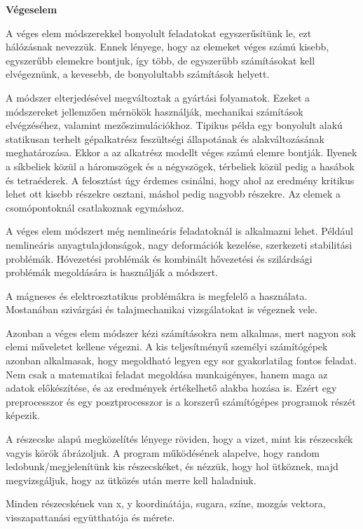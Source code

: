 \textbf{Végeselem}

A véges elem módszerekkel
bonyolult feladatokat egyszerűsítünk le, ezt hálózásnak nevezzük. Ennek lényege, hogy az elemeket véges számú kisebb, egyszerűbb elemekre bontjuk, így több, de egyszerűbb számításokat kell elvégeznünk, a kevesebb, de bonyolultabb számítások helyett.


A módszer elterjedésével megváltoztak a gyártási folyamatok. Ezeket a módszereket jellemzően mérnökök használják, mechanikai számítások elvégzéséhez, valamint mezőszimulációkhoz. Tipikus példa egy bonyolult alakú statikusan terhelt gépalkatrész feszültségi állapotának és alakváltozásának meghatározása. Ekkor a az alkatrész modellt véges számú elemre bontják. Ilyenek a síkbeliek közül a háromszögek és a négyszögek, térbeliek közül pedig a hasábok és tetraéderek. A felosztást úgy érdemes csinálni, hogy ahol az eredmény kritikus lehet ott kisebb részekre osztani, máshol pedig nagyobb részekre. Az elemek a csomópontoknál csatlakoznak egymáshoz. 


A véges elem módszert még nemlineáris feladatoknál is alkalmazni lehet. Például nemlineáris anyagtulajdonságok, nagy deformációk kezelése, szerkezeti stabilitási problémák. Hóvezetési problémák és kombinált hővezetési és szilárdsági problémák megoldására is használják a módszert. 


A mágneses és elektrosztatikus problémákra is megfelelő a használata. Mostanában szivárgási és talajmechanikai vizsgálatokat is végeznek vele. 

Azonban a véges elem módszer kézi számításokra nem alkalmas, mert nagyon sok elemi műveletet kellene végezni. A kis teljesítményű személyi számítógépek azonban alkalmasak, hogy megoldható legyen egy sor gyakorlatilag fontos feladat. Nem csak a matematikai feladat megoldása munkaigényes, hanem maga az adatok előkészítése, és az eredmények értékelhető alakba hozása is. Ezért egy preprocesszor és egy posztprocesszor is a korszerű számítógépes programok részét képezik.   






A részecske alapú megközelítés lényege röviden, hogy a vizet, mint kis részecskék vagyis körök ábrázoljuk. A program működésének alapelve, hogy random ledobunk/megjelenítünk kis részecskéket, és nézzük, hogy hol ütköznek, majd megvizsgáljuk, hogy az ütközés után merre kell haladniuk. 

Minden részecskének van x, y koordinátája, sugara, színe, mozgás vektora, visszapattanási együtthatója és mérete. 

